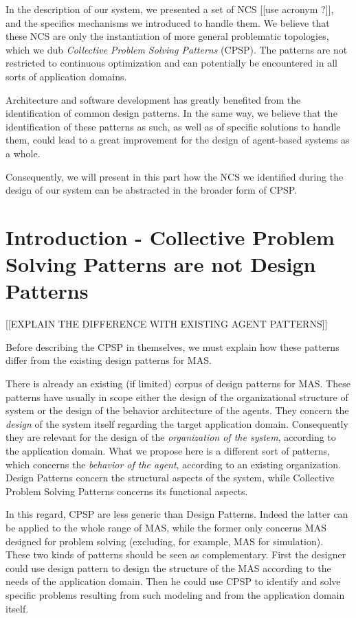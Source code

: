In the description of our system, we presented a set of NCS [[use acronym ?]], and the specifics mechanisms we introduced to handle them. We believe that these NCS are only the instantiation of more general problematic topologies, which we dub \emph{Collective Problem Solving Patterns} (CPSP). The patterns are not restricted to continuous optimization and can potentially be encountered in all sorts of application domains.

Architecture and software development has greatly benefited from the identification of common design patterns. In the same way, we believe that the identification of these patterns as such, as well as of specific solutions to handle them, could lead to a great improvement for the design of agent-based systems as a whole.

Consequently, we will present in this part how the NCS we identified during the design of our system can be abstracted in the broader form of CPSP.


\section{Introduction - Collective Problem Solving Patterns are not Design Patterns}

[[EXPLAIN THE DIFFERENCE WITH EXISTING AGENT PATTERNS]]

Before describing the CPSP in themselves, we must explain how these patterns differ from the existing design patterns for MAS.

There is already an existing (if limited) corpus of design patterns for MAS. These patterns have usually in scope either the design of the organizational structure of system or the design of the behavior architecture of the agents. They concern the \emph{design} of the system itself regarding the target application domain. Consequently they are relevant for the design of the \emph{organization of the system}, according to the application domain.
What we propose here is a different sort of patterns, which concerns the \emph{behavior of the agent}, according to an existing organization. Design Patterns concern the structural aspects of the system, while Collective Problem Solving Patterns concerns its functional aspects.

In this regard, CPSP are less generic than Design Patterns. Indeed the latter can be applied to the whole range of MAS, while the former only concerns MAS designed for problem solving (excluding, for example, MAS for simulation).\\
These two kinds of patterns should be seen as complementary. First the designer could use design pattern to design the structure of the MAS according to the needs of the application domain. Then he could use CPSP to identify and solve specific problems resulting from such modeling and from the application domain itself.

